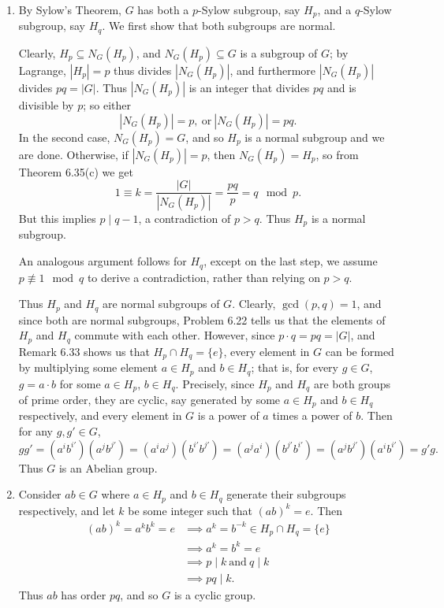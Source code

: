 \documentclass{homework}
\begin{document}
\begin{solution}
  \begin{enumerate}[label=(\alph*)]
    \item By Sylow's Theorem, $G$ has both a $p$-Sylow subgroup, say $H_p$, and a $q$-Sylow
      subgroup, say $H_q$. We first show that both subgroups are normal.

      Clearly, $H_p\subseteq N_G(H_p)$, and $N_G(H_p)\subseteq G$ is a subgroup of $G$; by Lagrange,
      $\left| H_p \right| =p$ thus divides $\left| N_G(H_p) \right| $, and furthermore $\left|
      N_G(H_p) \right| $ divides $pq=\left| G \right| $. Thus $\left| N_G(H_p) \right| $ is an
      integer that divides $pq$ and is divisible by $p$; so either \[
        \left| N_G(H_p) \right| =p, ~\text{or}~\left| N_G(H_p) \right| =pq
      .\] In the second case, $N_G(H_p)=G$, and so $H_p$ is a normal subgroup and we are done.
      Otherwise, if $\left| N_G(H_p) \right| =p$, then $N_G(H_p)=H_p$, so from Theorem 6.35(c) we
      get \[
        1\equiv k=\frac{\left| G \right| }{\left| N_G(H_p) \right|} = \frac{pq}{p}=q\mod{p}  
      .\] But this implies $p\mid q-1$, a contradiction of $p>q$. Thus $H_p$ is a normal subgroup.

      An analogous argument follows for $H_q$, except on the last step, we assume
      $p\not\equiv 1\mod{q}$ to derive a contradiction, rather than relying on $p>q$.

      Thus $H_p$ and $H_q$ are normal subgroups of $G$. Clearly, $\gcd{(p,q)}=1$, and since both are
      normal subgroups, Problem 6.22 tells us that the elements of $H_p$ and $H_q$ commute with each
      other. However, since $p\cdot q=pq=\left| G \right| $, and Remark 6.33 shows us that $H_p\cap
      H_q=\{ e \}$, every element in $G$ can be formed by multiplying some element $a\in H_p$ and
      $b\in H_q$; that is, for every $g\in G$, $g=a\cdot b$ for some $a\in H_p$, $b\in H_q$.
      Precisely, since $H_p$ and $H_q$ are both groups of prime order, they are cyclic, say
      generated by some $a\in H_p$ and $b\in H_q$ respectively, and every element in $G$ is a power
      of $a$ times a power of $b$. Then for any $g,g'\in G$, \[
        gg'=(a^ib^{i'})(a^jb^{j'})=(a^ia^j)(b^{i'}b^{j'})=(a^ja^i)(b^{j'}b^{i'})
        =(a^jb^{j'})(a^ib^{i'})=g'g
      .\] Thus $G$ is an Abelian group.
    \item Consider $ab\in G$ where $a\in H_p$ and $b\in H_q$ generate their subgroups respectively,
      and let $k$ be some integer such that $(ab)^k=e$. Then
      \begin{align*}
        (ab)^k=a^kb^k=e&\implies a^k=b^{-k}\in H_p\cap H_q=\{ e \}\\
                       &\implies a^k=b^k=e\\
                       &\implies p\mid k ~\text{and}~ q\mid k\\
                       &\implies pq\mid k
      .\end{align*} Thus $ab$ has order $pq$, and so $G$ is a cyclic group.
  \end{enumerate}
\end{solution}
\end{document}
